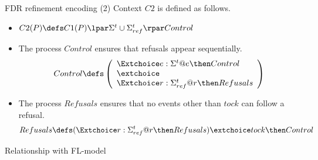 \documentclass[fleqn]{beamer}
\newenvironment{slide-nocite}[1]
{\begin{frame}[fragile,environment=slide-nocite]
\frametitle{#1}\begin{refsegment}}
{\end{refsegment}\end{frame}}%
\begin{document}
\begin{slide-nocite}{FDR refinement encoding (2)}
Context $C2$ is defined as follows.
\begin{itemize}
  \item $C2(P) \circdef C1(P) \lpar \Sigma^{t} \cup \Sigma^{t}_{ref} \rpar Control$
  \item The process $Control$ ensures that refusals appear sequentially.
   \begin{align*}
      Control \circdef \left(\begin{array}{l}
        \Extchoice e : \Sigma^{t} @ e \then Control
        \\ \extchoice \\
        \Extchoice r : \Sigma^{t}_{ref} @ r \then Refusals
      \end{array}\right)
    \end{align*}
  \item The process $Refusals$ ensures that no events other than $tock$ can follow
    a refusal.
    \begin{align*}
      Refusals \circdef (\Extchoice r : \Sigma^{t}_{ref} @ r \then Refusals) \extchoice tock \then Control
    \end{align*}
\end{itemize}
\end{slide-nocite}

\begin{slide-nocite}{Relationship with FL-model}

\end{slide-nocite}
\end{document}
